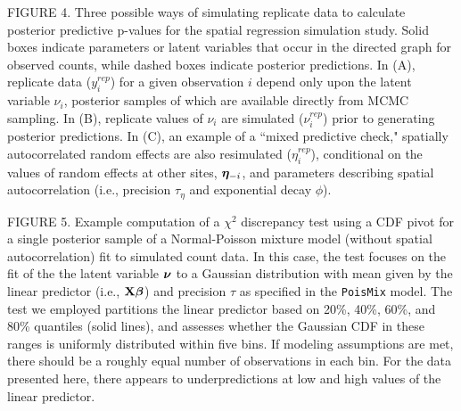 \documentclass[12pt,english]{article}
\begin{document}
\begin{spacing}{1.9}
FIGURE 4.  Three possible ways of simulating replicate data to
calculate posterior predictive p-values for the spatial regression
simulation study. Solid boxes indicate parameters or latent variables
that occur in the directed graph for observed counts, while dashed
boxes indicate posterior predictions.  In (A), replicate data
($y_i^{rep}$) for a given observation $i$ depend only upon the latent
variable $\nu_i$, posterior samples of which are available directly
from MCMC sampling.  In (B), replicate values of $\nu_i$ are simulated
($\nu_i^{rep}$) prior to generating posterior predictions.  In (C), an
example of a ``mixed predictive check," spatially autocorrelated
random effects are also resimulated ($\eta_i^{rep}$), conditional on
the values of random effects at other sites, $\boldsymbol{\eta}_{-i}$, and
parameters describing spatial autocorrelation (i.e., precision
$\tau_\eta$ and exponential decay $\phi$).

FIGURE 5.  Example computation of a $\chi^2$ discrepancy test using a
CDF pivot for a single posterior sample of a Normal-Poisson mixture
model (without spatial autocorrelation) fit to simulated count data.
In this case, the test focuses on the fit of the the latent variable
$\boldsymbol{\nu}$ to a Gaussian distribution with mean given by the linear
predictor (i.e., ${\bf X}\boldsymbol{\beta}$) and precision $\tau$ as specified in
the \texttt{PoisMix} model. The test we employed partitions the linear
predictor based on 20\%, 40\%, 60\%, and 80\% quantiles (solid lines),
and assesses whether the Gaussian CDF in these ranges is uniformly
distributed within five bins.  If modeling assumptions are met, there
should be a roughly equal number of observations in each bin.  For the
data presented here, there appears to underpredictions at low and high
values of the linear predictor.


\end{spacing}
\end{document}
